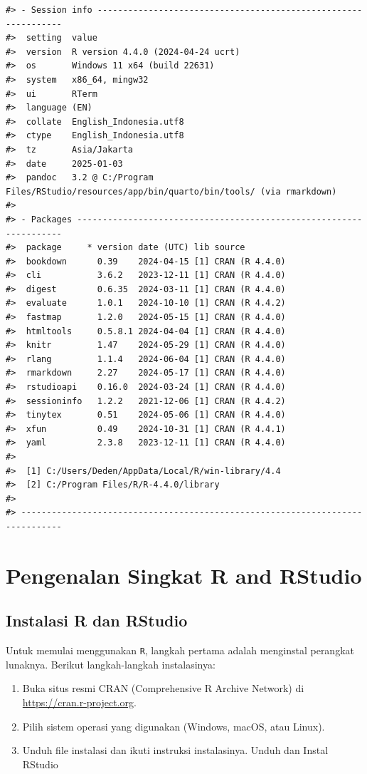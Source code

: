 \documentclass[
  oneside]{book}
\begin{document}
\begin{verbatim}
#> - Session info ---------------------------------------------------------------
#>  setting  value
#>  version  R version 4.4.0 (2024-04-24 ucrt)
#>  os       Windows 11 x64 (build 22631)
#>  system   x86_64, mingw32
#>  ui       RTerm
#>  language (EN)
#>  collate  English_Indonesia.utf8
#>  ctype    English_Indonesia.utf8
#>  tz       Asia/Jakarta
#>  date     2025-01-03
#>  pandoc   3.2 @ C:/Program Files/RStudio/resources/app/bin/quarto/bin/tools/ (via rmarkdown)
#> 
#> - Packages -------------------------------------------------------------------
#>  package     * version date (UTC) lib source
#>  bookdown      0.39    2024-04-15 [1] CRAN (R 4.4.0)
#>  cli           3.6.2   2023-12-11 [1] CRAN (R 4.4.0)
#>  digest        0.6.35  2024-03-11 [1] CRAN (R 4.4.0)
#>  evaluate      1.0.1   2024-10-10 [1] CRAN (R 4.4.2)
#>  fastmap       1.2.0   2024-05-15 [1] CRAN (R 4.4.0)
#>  htmltools     0.5.8.1 2024-04-04 [1] CRAN (R 4.4.0)
#>  knitr         1.47    2024-05-29 [1] CRAN (R 4.4.0)
#>  rlang         1.1.4   2024-06-04 [1] CRAN (R 4.4.0)
#>  rmarkdown     2.27    2024-05-17 [1] CRAN (R 4.4.0)
#>  rstudioapi    0.16.0  2024-03-24 [1] CRAN (R 4.4.0)
#>  sessioninfo   1.2.2   2021-12-06 [1] CRAN (R 4.4.2)
#>  tinytex       0.51    2024-05-06 [1] CRAN (R 4.4.0)
#>  xfun          0.49    2024-10-31 [1] CRAN (R 4.4.1)
#>  yaml          2.3.8   2023-12-11 [1] CRAN (R 4.4.0)
#> 
#>  [1] C:/Users/Deden/AppData/Local/R/win-library/4.4
#>  [2] C:/Program Files/R/R-4.4.0/library
#> 
#> ------------------------------------------------------------------------------
\end{verbatim}

\section{Pengenalan Singkat R and RStudio}\label{pengenalan-singkat-r-and-rstudio}

\subsection*{Instalasi R dan RStudio}\label{instalasi-r-dan-rstudio}

Untuk memulai menggunakan \texttt{R}, langkah pertama adalah
menginstal perangkat lunaknya. Berikut langkah-langkah instalasinya:

\begin{enumerate}
\def\labelenumi{\arabic{enumi}.}
\item
  Buka situs resmi CRAN (Comprehensive R Archive Network) di
  \url{https://cran.r-project.org}.
\item
  Pilih sistem operasi yang digunakan (Windows, macOS, atau Linux).
\item
  Unduh file instalasi dan ikuti instruksi instalasinya. Unduh dan
  Instal RStudio
\end{enumerate}
\end{document}
